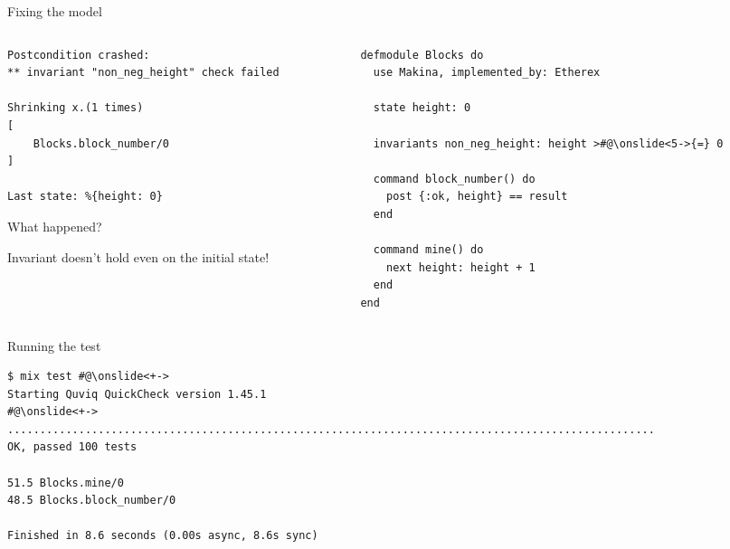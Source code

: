 \documentclass[aspectratio=169, 10pt]{beamer}
\begin{document}
\begin{frame}[label={sec:orgef5845b},fragile]{Fixing the model}
 \begin{columns}
\begin{column}{0.48\columnwidth}
\onslide<+->
\onslide<+->
\lstset{language=bash,label= ,caption= ,captionpos=b,numbers=none,style=shell}
\begin{lstlisting}
Postcondition crashed:
** invariant "non_neg_height" check failed

Shrinking x.(1 times)
[
    Blocks.block_number/0
]

Last state: %{height: 0}
\end{lstlisting}

\onslide<+->
What happened?

\vspace{10pt}
\onslide<+->
Invariant doesn't hold even on the initial state!
\end{column}

\begin{column}{0.48\columnwidth}
\lstset{language=elixir,label= ,caption= ,captionpos=b,numbers=none,style=display}
\begin{lstlisting}
defmodule Blocks do
  use Makina, implemented_by: Etherex

  state height: 0

  invariants non_neg_height: height >#@\onslide<5->{=} 0

  command block_number() do
    post {:ok, height} == result
  end

  command mine() do
    next height: height + 1
  end
end
\end{lstlisting}
\end{column}
\end{columns}
\end{frame}

\begin{frame}[label={sec:orgcc522d4},fragile]{Running the test}
 \onslide<+->
\onslide<+->
\lstset{language=bash,label= ,caption= ,captionpos=b,numbers=none,style=shell}
\begin{lstlisting}
$ mix test #@\onslide<+->
Starting Quviq QuickCheck version 1.45.1
#@\onslide<+->
....................................................................................................
OK, passed 100 tests

51.5 Blocks.mine/0
48.5 Blocks.block_number/0

Finished in 8.6 seconds (0.00s async, 8.6s sync)
\end{lstlisting}
\end{frame}
\end{document}
